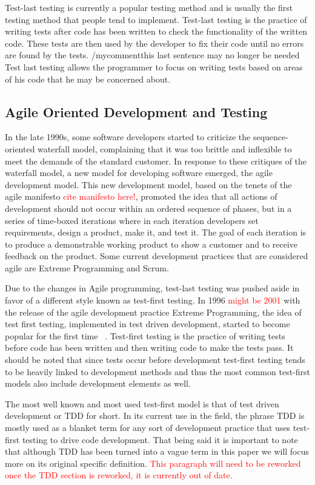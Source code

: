 \documentclass{sig-alternate}
\newcommand{\mycomment}[1]{\textcolor{red}{#1}}
\begin{document}
Test-last testing is currently a popular testing method and is usually the first testing method that people tend to implement.  Test-last testing is the practice of writing tests after code has been written to check the functionality of the written code.  These tests are then used by the developer to fix their code until no errors are found by the tests.  /mycomment{this last sentence may no longer be needed} Test last testing allows the programmer to focus on writing tests based on areas of his code that he may be concerned about.

\subsection{Agile Oriented Development and Testing}

In the late 1990s, some software developers started to criticize the sequence-oriented waterfall model, complaining that it was too brittle and inflexible to meet the demands of the standard customer.  In response to these critiques of the waterfall model, a new model for developing software emerged, the agile development model.  This new development model, based on the tenets of the agile manifesto \mycomment{cite manifesto here!}, promoted the idea that all actions of development should not occur within an ordered sequence of phases, but in a series of time-boxed iterations where in each iteration developers set requirements, design a product, make it, and test it.  The goal of each iteration is to produce a demonstrable working product to show a customer and to receive feedback on the product.  Some current development practices that are considered agile are Extreme Programming and Scrum.

Due to the changes in Agile programming, test-last testing was pushed aside in favor of a different style known as test-first testing.  In 1996 \mycomment{might be 2001} with the release of the agile development practice Extreme Programming, the idea of test first testing, implemented in test driven development, started to become popular for the first time ~\cite{Hammond:2012}. Test-first testing is the practice of writing tests before code has been written and then writing code to make the tests pass.  It should be noted that since tests occur before development test-first testing tends to be heavily linked to development methods and thus the most common test-first models also include development elements as well. 

The most well known and most used test-first model is that of test driven development or TDD for short.  In its current use in the field, the phrase TDD is mostly used as a blanket term for any sort of development practice that uses test-first testing to drive code development. That being said it is important to note that although TDD has been turned into a vague term in this paper we will focus more on its original specific definition.  \mycomment{This paragraph will need to be reworked once the TDD section is reworked, it is currently out of date.} 
\end{document}
